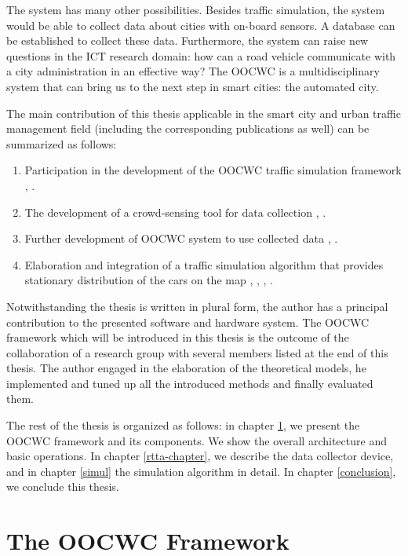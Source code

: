 \documentclass[b5paper,12pt]{report}
\theoremstyle{definition}
\begin{document}
The system has many other possibilities. Besides traffic simulation, the system would be able to collect data about cities with on-board sensors. A database can be established to collect these data. Furthermore, the system can raise new questions in the ICT research domain: how can a road vehicle communicate with a city administration in an effective way? The OOCWC is a multidisciplinary system that can bring us to the next step in smart cities: the automated city.

The main contribution of this thesis applicable in the smart city and urban traffic management field (including the corresponding publications as well) can be summarized as follows:

\begin{enumerate}
  \item Participation in the development of the OOCWC traffic simulation framework \cite{7231223}, \cite{infocomjournal}.
  \item The development of a crowd-sensing tool for data collection \cite[/real-time-traffic-analyzer/]{csts-repo}, \cite{usingcoginfocom}.
  \item Further development of OOCWC system to use collected data \cite{infocomjournal}, \cite{csts-repo}.
  \item Elaboration and integration of a traffic simulation algorithm that provides stationary distribution of the cars on the map \cite{traffic-paper}, \cite{dssv-talk}, \cite{zeg-talk}, \cite[/justine/]{csts-repo}.
\end{enumerate}

Notwithstanding the thesis is written in plural form, the author has a principal contribution to the presented software and hardware system. The OOCWC framework which will be introduced in this thesis is the outcome of the collaboration of a research group with several members listed at the end of this thesis. The author engaged in the elaboration of the theoretical models, he implemented and tuned up all the introduced methods and finally evaluated them.

The rest of the thesis is organized as follows: in chapter \ref{oocwc}, we present the OOCWC framework and its components. We show the overall architecture and basic operations. In chapter \ref{rtta-chapter}, we describe the data collector device, and in chapter \ref{simul} the simulation algorithm in detail. In chapter \ref{conclusion}, we conclude this thesis.

\chapter{The OOCWC Framework}
\label{oocwc}
\end{document}
